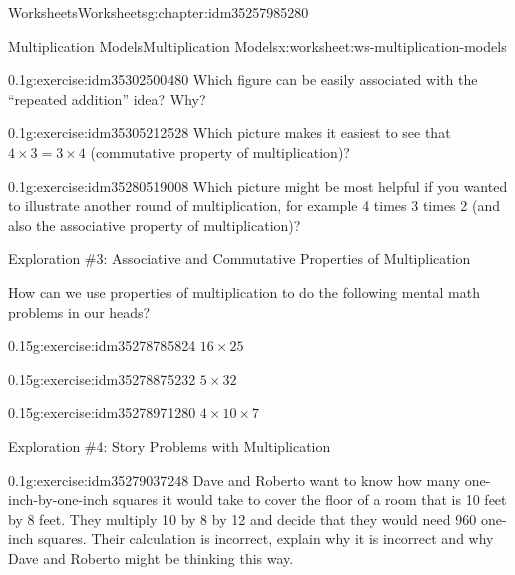\documentclass[twoside,11pt,]{book}
\begin{document}
\begin{chapterptx}{Worksheets}{}{Worksheets}{}{}{g:chapter:idm35257985280}
\begin{worksheet-section-numberless}{Multiplication Models}{}{Multiplication Models}{}{}{x:worksheet:ws-multiplication-models}
\begin{introduction}{}
\begin{description}
\begin{sidebyside}{1}{0.3}{0.3}{0}
\begin{sbspanel}{0.4}
\end{sbspanel}%
\end{sidebyside}%
\end{description}
\end{introduction}%
\begin{divisionexercise}{5}{}{0.1}{g:exercise:idm35302500480}%
Which figure can be easily associated with the ``repeated addition'' idea? Why?%
\end{divisionexercise}%
\begin{divisionexercise}{6}{}{0.1}{g:exercise:idm35305212528}%
Which picture makes it easiest to see that \(4 \times 3 = 3 \times 4 \) (commutative property of multiplication)?%
\end{divisionexercise}%
\begin{divisionexercise}{7}{}{0.1}{g:exercise:idm35280519008}%
Which picture might be most helpful if you wanted to illustrate another round of multiplication, for example 4 times 3 times 2 (and also the associative property of multiplication)?%
\end{divisionexercise}%
\clearpage
\begin{introduction}{}%
Exploration \#3: Associative and Commutative Properties of Multiplication%
\par
How can we use properties of multiplication to do the following mental math problems in our heads?%
\end{introduction}%
\begin{divisionexercise}{8}{}{0.15}{g:exercise:idm35278785824}%
\(16 \times 25  \)%
\end{divisionexercise}%
\begin{divisionexercise}{9}{}{0.15}{g:exercise:idm35278875232}%
\(5 \times 32  \)%
\end{divisionexercise}%
\begin{divisionexercise}{10}{}{0.15}{g:exercise:idm35278971280}%
\(4 \times 10 \times 7  \)%
\end{divisionexercise}%
\begin{introduction}{}%
Exploration \#4: Story Problems with Multiplication\end{introduction}%
\begin{divisionexercise}{11}{}{0.1}{g:exercise:idm35279037248}%
Dave and Roberto want to know how many one-inch-by-one-inch squares it would take to cover the floor of a room that is 10 feet by 8 feet.  They multiply 10 by 8 by 12 and decide that they would need 960 one-inch squares.  Their calculation is incorrect, explain why it is incorrect and why Dave and Roberto might be thinking this way.%

\end{divisionexercise}
\end{worksheet-section-numberless}
\end{chapterptx}
\end{document}
